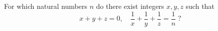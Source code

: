 \problem
For which natural numbers $n$ do there exist integers $x, y, z$ such that
\[
    x + y + z = 0
,\quad
    \frac{1}{x} + \frac{1}{y} + \frac{1}{z} = \frac{1}{n}
\;?\]
\solution
\endproblem
